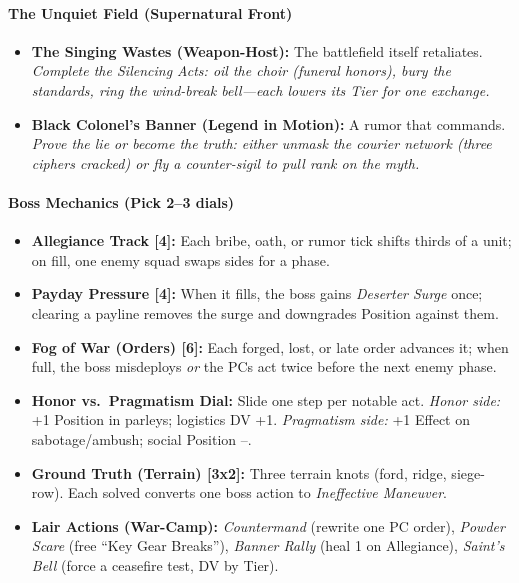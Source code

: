 \paragraph{The Unquiet Field (Supernatural Front)}
\begin{itemize}
  \item \textbf{The Singing Wastes (Weapon-Host):} The battlefield itself retaliates. \emph{Complete the \textit{Silencing Acts}: oil the choir (funeral honors), bury the standards, ring the wind-break bell—each lowers its Tier for one exchange.}
  \item \textbf{Black Colonel’s Banner (Legend in Motion):} A rumor that commands. \emph{Prove the lie or become the truth: either unmask the courier network (three ciphers cracked) or fly a counter-sigil to pull rank on the myth.}
\end{itemize}

\paragraph{Boss Mechanics (Pick 2–3 dials)}
\begin{itemize}
  \item \textbf{Allegiance Track [4]:} Each bribe, oath, or rumor tick shifts thirds of a unit; on fill, one enemy squad swaps sides for a phase.
  \item \textbf{Payday Pressure [4]:} When it fills, the boss gains \emph{Deserter Surge} once; clearing a payline removes the surge and downgrades Position against them.
  \item \textbf{Fog of War (Orders) [6]:} Each forged, lost, or late order advances it; when full, the boss misdeploys \emph{or} the PCs act twice before the next enemy phase.
  \item \textbf{Honor vs.\ Pragmatism Dial:} Slide one step per notable act. \emph{Honor side:} +1 Position in parleys; logistics DV +1. \emph{Pragmatism side:} +1 Effect on sabotage/ambush; social Position --.
  \item \textbf{Ground Truth (Terrain) [3x2]:} Three terrain knots (ford, ridge, siege-row). Each solved converts one boss action to \emph{Ineffective Maneuver}.
  \item \textbf{Lair Actions (War-Camp):} \emph{Countermand} (rewrite one PC order), \emph{Powder Scare} (free “Key Gear Breaks”), \emph{Banner Rally} (heal 1 on Allegiance), \emph{Saint’s Bell} (force a ceasefire test, DV by Tier).
\end{itemize}